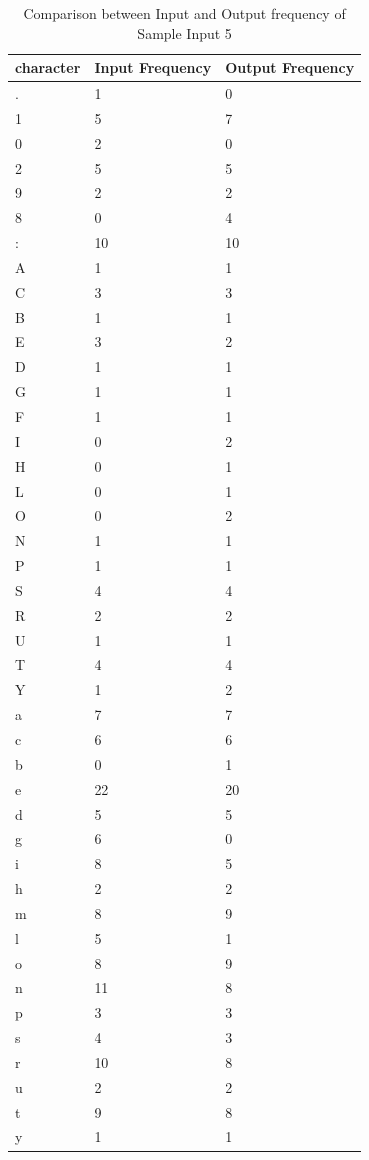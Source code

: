 \begin{table}[H]
\centering
\begin{tabular}{|p{2cm}|p{2cm}|p{2cm}|}
\hline
character & Input Frequency & Output Frequency \\
\hline
. & 1 & 0\\
\hline
1 & 5 & 7\\
\hline
0 & 2 & 0\\
\hline
2 & 5 & 5\\
\hline
9 & 2 & 2\\
\hline
8 & 0 & 4\\
\hline
: & 10 & 10\\
\hline
A & 1 & 1\\
\hline
C & 3 & 3\\
\hline
B & 1 & 1\\
\hline
E & 3 & 2\\
\hline
D & 1 & 1\\
\hline
G & 1 & 1\\
\hline
F & 1 & 1\\
\hline
I & 0 & 2\\
\hline
H & 0 & 1\\
\hline
L & 0 & 1\\
\hline
O & 0 & 2\\
\hline
N & 1 & 1\\
\hline
P & 1 & 1\\
\hline
S & 4 & 4\\
\hline
R & 2 & 2\\
\hline
U & 1 & 1\\
\hline
T & 4 & 4\\
\hline
Y & 1 & 2\\
\hline
a & 7 & 7\\
\hline
c & 6 & 6\\
\hline
b & 0 & 1\\
\hline
e & 22 & 20\\
\hline
d & 5 & 5\\
\hline
g & 6 & 0\\
\hline
i & 8 & 5\\
\hline
h & 2 & 2\\
\hline
m & 8 & 9\\
\hline
l & 5 & 1\\
\hline
o & 8 & 9\\
\hline
n & 11 & 8\\
\hline
p & 3 & 3\\
\hline
s & 4 & 3\\
\hline
r & 10 & 8\\
\hline
u & 2 & 2\\
\hline
t & 9 & 8\\
\hline
y & 1 & 1\\
\hline
\end{tabular}
\caption {Comparison between Input and Output frequency of Sample Input 5}
\label {tab:Table5}
\end{table}

